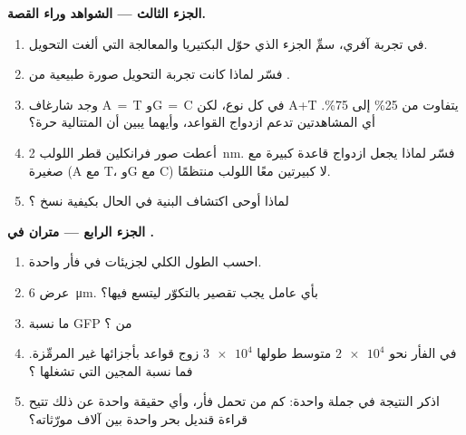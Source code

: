 \begin{problem}
\medskip
\noindent\textbf{الجزء الثالث --- الشواهد وراء القصة.}
\begin{enumerate}[resume]
  \item في تجربة آفري، سمِّ الجزء الذي حوّل البكتيريا والمعالجة التي
        ألغت التحويل.
  \item فسّر لماذا كانت تجربة التحويل صورة طبيعية من .
  \item وجد شارغاف A$\,=\,$T وG$\,=\,$C في كل نوع، لكن A+T يتفاوت من
        25\% إلى 75\%. أي المشاهدتين تدعم ازدواج القواعد، وأيهما يبين
        أن المتتالية حرة؟
  \item أعطت صور فرانكلين قطر اللولب \qty{2}{nm}. فسّر لماذا يجعل
        ازدواج قاعدة كبيرة مع صغيرة (A مع T، وG مع C) لا كبيرتين معًا
        اللولب منتظمًا.
  \item لماذا أوحى اكتشاف البنية في الحال بكيفية نسخ ؟
\end{enumerate}

\medskip
\noindent\textbf{الجزء الرابع --- متران في .}
\begin{enumerate}[resume]
  \item احسب الطول الكلي لجزيئات  في  فأر واحدة.
  \item عرض  \qty{6}{\micro m}. بأي عامل يجب تقصير  بالتكوّر
        ليتسع فيها؟
  \item ما نسبة  GFP من  ؟
  \item في الفأر نحو $\num{2e4}$  متوسط طولها $\num{3e4}$ زوج
        قواعد بأجزائها غير المرمِّزة. فما نسبة المجين التي تشغلها
        ؟
  \item اذكر النتيجة في جملة واحدة: كم من  تحمل  فأر، وأي
        حقيقة واحدة عن ذلك  تتيح قراءة  قنديل بحر واحدة بين
        آلاف مورّثاته؟
\end{enumerate}
\end{problem}

